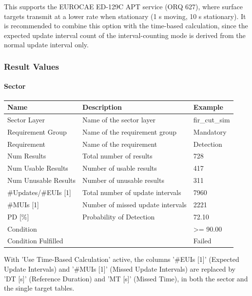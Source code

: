 This supports the EUROCAE ED-129C APT service (ORQ 627), where surface targets transmit at a lower rate when stationary (1 s moving, 10 s stationary). It is recommended to combine this option with the time-based calculation, since the expected update interval count of the interval-counting mode is derived from the normal update interval only.

\subsubsection{Result Values}

\paragraph{Sector}

\begin{center}
 \begin{table}[H]
  \begin{tabularx}{\textwidth}{ | l | X |  l | }
    \hline
    \textbf{Name} & \textbf{Description} & \textbf{Example} \\ \hline
    Sector Layer & Name of the sector layer & fir\_cut\_sim \\ \hline
    Requirement Group & Name of the requirement group & Mandatory  \\ \hline
    Requirement & Name of the requirement & Detection  \\ \hline
    Num Results & Total number of results & 728  \\ \hline
    Num Usable Results & Number of usable results & 417  \\ \hline
    Num Unusable Results & Number of unusable results & 311  \\ \hline
    \#Updates/\#EUIs [1] & Total number of update intervals & 7960  \\ \hline
    \#MUIs [1] & Number of missed update intervals & 2221  \\ \hline
    PD [\%] & Probability of Detection & 72.10  \\ \hline
    Condition &  & >= 90.00  \\ \hline
    Condition Fulfilled &  & Failed  \\ \hline
\end{tabularx}
\end{table}
\end{center}

With 'Use Time-Based Calculation' active, the columns '\#EUIs [1]' (Expected Update Intervals) and '\#MUIs [1]' (Missed Update Intervals) are replaced by 'DT [s]' (Reference Duration) and 'MT [s]' (Missed Time), in both the sector and the single target tables. \\

